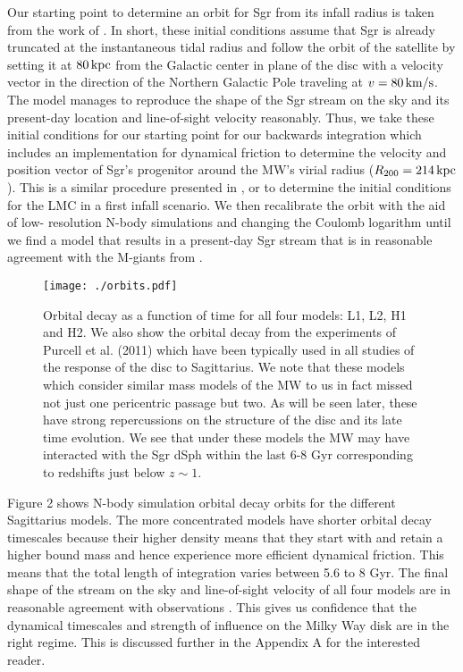 \documentclass[useAMS,usenatbib]{mnras}
\begin{document}
Our starting point to determine an orbit for Sgr from its infall radius is taken from the work of \citep{purcell11}. In short, these initial conditions assume that Sgr is already truncated at the instantaneous tidal radius and follow the orbit of the satellite by setting it at $80 \,\rm{kpc}$ from the Galactic center in plane of the disc with a velocity vector in the direction of the Northern Galactic Pole traveling at $v=80\,\rm{km/s}$. The model manages to reproduce the shape of the Sgr stream on the sky and its present-day location and line-of-sight velocity reasonably. Thus, we take these initial conditions for our starting point for our backwards integration which includes an implementation for dynamical friction \citep{Chandrasekhar1943} to determine the velocity and position vector of Sgr's progenitor around the MW's virial radius ($R_{200}=214 \,\rm{kpc}$). This is a similar procedure presented in \cite{kallivayalil13}, \cite{gomez15} or \cite{laporte16} to determine the initial conditions for the LMC in a first infall scenario. We then recalibrate the orbit with the aid of low- resolution N-body simulations and changing the Coulomb logarithm until we find a model that results in a present-day Sgr stream that is in reasonable agreement with the M-giants from \cite{majewski03}.
\begin{figure}
\texttt{[image: ./orbits.pdf]}
\caption[]{Orbital decay as a function of time for all four models: L1, L2, H1 and H2. We also show the orbital decay from the experiments of Purcell et al. (2011) which have been typically used in all studies of the response of the disc to Sagittarius. We note that these models which consider similar mass models of the MW to us in fact missed not just one pericentric passage but two. As will be seen later, these have strong repercussions on the structure of the disc and its late time evolution. We see that under these models the MW may have interacted with the Sgr dSph within the last 6-8 Gyr corresponding to redshifts just below $z\sim1$.}
\end{figure}
Figure 2 shows N-body simulation orbital decay orbits for the different Sagittarius models. The more concentrated models have shorter orbital decay timescales because their higher density means that they start with and retain a higher bound mass and hence experience more efficient dynamical friction. This means that the total length of integration varies between 5.6 to 8 Gyr. The final shape of the stream on the sky and line-of-sight velocity of all four models are in reasonable agreement with observations \citep{majewski03}. This gives us confidence that the dynamical timescales and strength of influence on the Milky Way disk are in the right regime. This is discussed further in the Appendix A for the interested reader.
\end{document}
